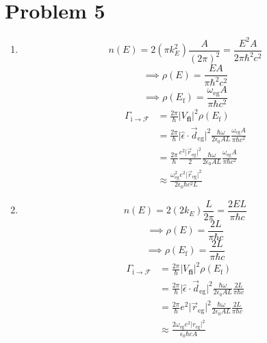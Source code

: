 \documentclass[12pt]{article}
\newcommand{\magsq}[1]{\big|#1\big|^2}
\begin{document}
\section*{Problem 5}
\begin{enumerate}[label=(\alph*)]
    \item 
    \[ n(E) = 2(\pi k_E^2)\frac{A}{(2\pi)^2} = \frac{E^2A}{2\pi\hbar^2c^2}  \]
    \[ \implies \rho(E) = \frac{EA}{\pi\hbar^2c^2} \]
    \[ \implies \rho(E_\text{f}) = \frac{\omega_\text{eg}A}{\pi\hbar c^2} \]
    \begin{align*}
        \Gamma_{\text{i}\to\mathcal{F}} &= \frac{2\pi}{\hbar}\magsq{V_\textbf{fi}}\rho(E_\text{f}) \\
        &= \frac{2\pi}{\hbar}\magsq{\hat{\epsilon}\cdot\vec{d}_\text{eg}} \frac{\hbar\omega}{2\epsilon_0AL}\frac{\omega_\text{eg}A}{\pi\hbar c^2} \\
        &= \frac{2\pi}{\hbar}\frac{e^2\magsq{\vec{r}_\text{eg}}}{2} \frac{\hbar\omega}{2\epsilon_0AL}\frac{\omega_\text{eg}A}{\pi\hbar c^2} \\
        &\approx \frac{\omega_\text{eg}^2e^2\magsq{\vec{r}_\text{eg}}}{2\epsilon_0\hbar c^2 L}
    \end{align*}

    \item 
    \[ n(E) = 2(2k_E)\frac{L}{2\pi} = \frac{2EL}{\pi\hbar c}  \]
    \[ \implies \rho(E) = \frac{2L}{\pi\hbar c} \]
    \[ \implies \rho(E_\text{f}) = \frac{2L}{\pi\hbar c} \]
    \begin{align*}
        \Gamma_{\text{i}\to\mathcal{F}} &= \frac{2\pi}{\hbar}\magsq{V_\textbf{fi}}\rho(E_\text{f}) \\
        &= \frac{2\pi}{\hbar}\magsq{\hat{\epsilon}\cdot\vec{d}_\text{eg}} \frac{\hbar\omega}{2\epsilon_0AL}\frac{2L}{\pi\hbar c} \\
        &= \frac{2\pi}{\hbar}e^2\magsq{\vec{r}_\text{eg}} \frac{\hbar\omega}{2\epsilon_0AL}\frac{2L}{\pi\hbar c} \\
        &\approx \frac{2\omega_\text{eg}e^2\magsq{r_\text{eg}}}{\epsilon_0\hbar cA}
    \end{align*}
\end{enumerate}
\end{document}
